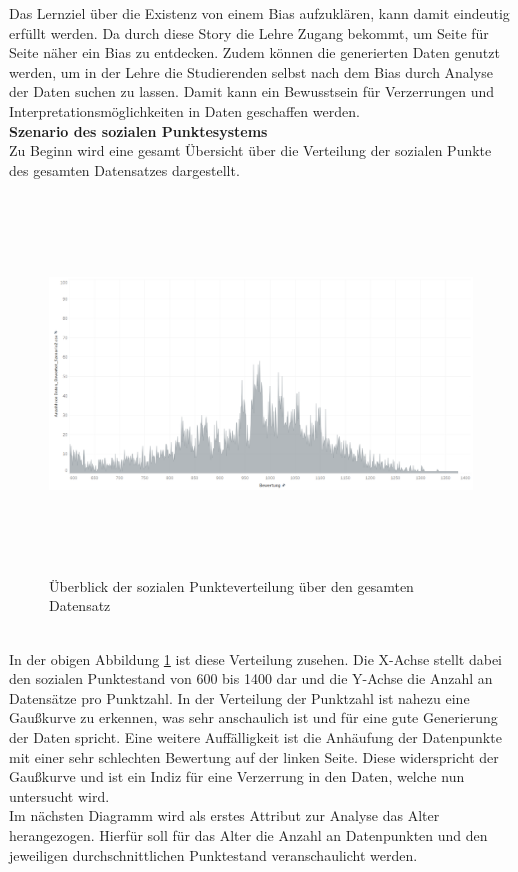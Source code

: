 \begin{onehalfspace}
Das Lernziel über die Existenz von einem Bias aufzuklären, kann damit eindeutig erfüllt werden. Da durch diese Story die Lehre Zugang bekommt, um Seite für Seite näher ein Bias zu entdecken. Zudem können die generierten Daten genutzt werden, um in der Lehre die Studierenden selbst nach dem Bias durch Analyse der Daten suchen zu lassen. Damit kann ein Bewusstsein für Verzerrungen und Interpretationsmöglichkeiten in Daten geschaffen werden.\\
\textbf{Szenario des sozialen Punktesystems}\\
Zu Beginn wird eine gesamt Übersicht über die Verteilung der sozialen Punkte des gesamten Datensatzes dargestellt.
\begin{figure}[h]
    \centering
    \includegraphics[width=16cm,height=10cm]{Diagramme/Tab_Point1.PNG}
    \caption{Überblick der sozialen Punkteverteilung über den gesamten Datensatz}
    \label{fig:TabPoint1}
\end{figure}\\
In der obigen Abbildung \ref{fig:TabPoint1} ist diese Verteilung zusehen. Die X-Achse stellt dabei den sozialen Punktestand von 600 bis 1400 dar und die Y-Achse die Anzahl an Datensätze pro Punktzahl. In der Verteilung der Punktzahl ist nahezu eine Gaußkurve zu erkennen, was sehr anschaulich ist und für eine gute Generierung der Daten spricht. Eine weitere Auffälligkeit ist die Anhäufung der Datenpunkte mit einer sehr schlechten Bewertung auf der linken Seite. Diese widerspricht der Gaußkurve und ist ein Indiz für eine Verzerrung in den Daten, welche nun untersucht wird.\\
Im nächsten Diagramm wird als erstes Attribut zur Analyse das Alter herangezogen. Hierfür soll für das Alter die Anzahl an Datenpunkten und den jeweiligen durchschnittlichen Punktestand veranschaulicht werden.

\end{onehalfspace}
